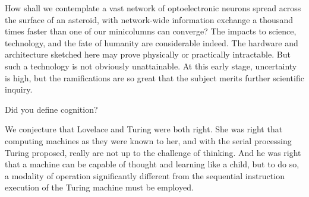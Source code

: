 \documentclass[twocolumn]{article}
\begin{document}
How shall we contemplate a vast network of optoelectronic neurons spread across the surface of an asteroid, with network-wide information exchange a thousand times faster than one of our minicolumns can converge? The impacts to science, technology, and the fate of humanity are considerable indeed. The hardware and architecture sketched here may prove physically or practically intractable. But such a technology is not obviously unattainable. At this early stage, uncertainty is high, but the ramifications are so great that the subject merits further scientific inquiry.

\vspace{3em}
Did you define cognition?



We conjecture that Lovelace and Turing were both right. She was right that computing machines as they were known to her, and with the serial processing Turing proposed, really are not up to the challenge of thinking. And he was right that a machine can be capable of thought and learning like a child, but to do so, a modality of operation significantly different from the sequential instruction execution of the Turing machine must be employed.
\end{document}
